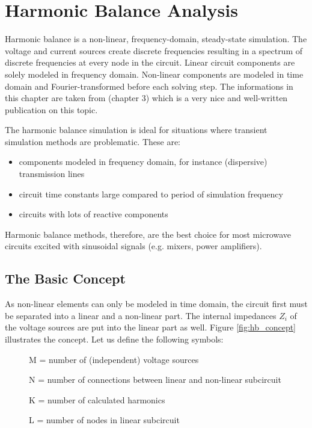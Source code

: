 %
%
%
%

\chapter{Harmonic Balance Analysis}
\label{sec:hb_analysis}

Harmonic balance is a non-linear, frequency-domain, steady-state
simulation.  The voltage and current sources create discrete
frequencies resulting in a spectrum of discrete frequencies at every
node in the circuit. Linear circuit components are solely modeled in
frequency domain. Non-linear components are modeled in time domain and
Fourier-transformed before each solving step.  The informations in
this chapter are taken from \cite{Maas1} (chapter 3) which is a very
nice and well-written publication on this topic.

\addvspace{12pt}

The harmonic balance simulation is ideal for situations where
transient simulation methods are problematic. These are:
\begin{itemize}
\item components modeled in frequency domain, for instance (dispersive)
      transmission lines
\item circuit time constants large compared to period of simulation
      frequency
\item circuits with lots of reactive components
\end{itemize}
Harmonic balance methods, therefore, are the best choice for most microwave
circuits excited with sinusoidal signals (e.g. mixers, power amplifiers).


\section{The Basic Concept}

As non-linear elements can only be modeled in time domain, the circuit
first must be separated into a linear and a non-linear part. The
internal impedances $Z_i$ of the voltage sources are put into the
linear part as well. Figure \ref{fig:hb_concept} illustrates the
concept. Let us define the following symbols:
\begin{description}
\item[] M = number of (independent) voltage sources
\item[] N = number of connections between linear and non-linear subcircuit
\item[] K = number of calculated harmonics
\item[] L = number of nodes in linear subcircuit
\end{description}


